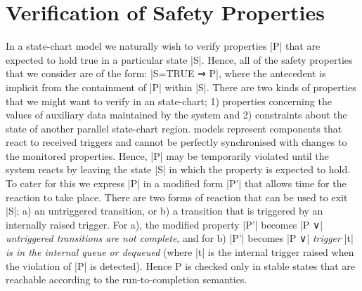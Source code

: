 

\section{Verification of Safety Properties}
\label{sec:verificationSafety}

In a state-chart model we naturally wish to verify properties |P| that are expected to hold true in a particular state |S|.
Hence, all of the safety properties that we consider are of the form: |S=TRUE ⇒ P|, where the antecedent is implicit from the containment of |P| within |S|.
There are two kinds of properties that we might want to verify in an \SCXML state-chart;
1) properties concerning the values of auxiliary data maintained by the system and 
2) constraints about the state of another parallel state-chart region.
\SCXML models represent components that react to received triggers and cannot be perfectly synchronised with changes to the monitored properties. 
Hence, |P| may be temporarily violated until the system reacts by leaving the state |S| in which the property is expected to hold.
To cater for this we express |P| in a modified form |P'| that allows time for the reaction to take place. 
There are two forms of reaction that can be used to exit |S|; 
a) an untriggered transition, or 
b) a transition that is triggered by an internally raised trigger.
For a), the modified property |P'| becomes |P ∨| \emph{untriggered transitions are not complete}, 
and for b) |P'| becomes |P ∨| \emph{trigger} |t| \emph{is in the internal queue or dequeued}
(where |t| is the internal trigger raised when the violation of |P| is detected).
Hence P is checked only in stable states that are reachable according to the run-to-completion semantics.



